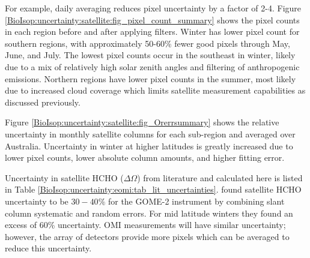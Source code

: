     For example, daily averaging reduces pixel uncertainty by a factor of 2-4.
    Figure \ref{BioIsop:uncertainty:satellite:fig_pixel_count_summary} shows the pixel counts in each region before and after applying filters.
    Winter has lower pixel count for southern regions, with approximately 50-60\% fewer good pixels through May, June, and July.
    The lowest pixel counts occur in the southeast in winter, likely due to a mix of relatively high solar zenith angles and filtering of anthropogenic emissions.
    Northern regions have lower pixel counts in the summer, most likely due to increased cloud coverage which limits satellite measurement capabilities as discussed previously.
    
    
    
    
    
    Figure \ref{BioIsop:uncertainty:satellite:fig_Orerrsummary} shows the relative uncertainty in monthly satellite columns for each sub-region and averaged over Australia.
    Uncertainty in winter at higher latitudes is greatly increased due to lower pixel counts, lower absolute column amounts, and higher fitting error.
    
    
    
    
    Uncertainty in satellite HCHO ($\Delta{\Omega}$) from literature and calculated here is listed in Table \ref{BioIsop:uncertainty:eomi:tab_lit_uncertainties}.
    \textcite{DeSmedt2012} found satellite HCHO uncertainty to be $30-40\%$ for the GOME-2 instrument by combining slant column systematic and random errors.
    For mid latitude winters they found an excess of 60\% uncertainty.
    OMI measurements will have similar  uncertainty; however, the array of detectors provide more pixels which can be averaged to reduce this uncertainty.
    
